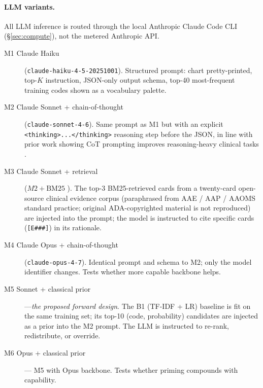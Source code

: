 \documentclass[preprint,authoryear,1p,12pt]{elsarticle}
\begin{document}
\paragraph{LLM variants.} All LLM inference is routed through the local
Anthropic Claude Code CLI (\S\ref{sec:compute}), not the metered
Anthropic API.

\begin{description}
    \item[M1 Claude Haiku] (\texttt{claude-haiku-4-5-20251001}). Structured
      prompt: chart pretty-printed, top-\(K\) instruction, JSON-only
      output schema, top-40 most-frequent training codes shown as a
      vocabulary palette.
    \item[M2 Claude Sonnet + chain-of-thought]
      (\texttt{claude-sonnet-4-6}). Same prompt as M1 but with an
      explicit \texttt{<thinking>...</thinking>} reasoning step before
      the JSON, in line with prior work showing CoT prompting improves
      reasoning-heavy clinical tasks
      \citep{wei2022chain,nori2023capabilities}.
    \item[M3 Claude Sonnet + retrieval] (\(M2 + \text{BM25}\)
      \citep{robertson1995bm25}). The top-3 BM25-retrieved cards from a
      twenty-card open-source clinical evidence corpus (paraphrased
      from AAE / AAP / AAOMS standard practice; original ADA-copyrighted
      material is not reproduced) are injected into the prompt; the
      model is instructed to cite specific cards (\texttt{[E\#\#\#]})
      in its rationale.
    \item[M4 Claude Opus + chain-of-thought] (\texttt{claude-opus-4-7}).
      Identical prompt and schema to M2; only the model identifier
      changes. Tests whether more capable backbone helps.
    \item[M5 Sonnet + classical prior]\hspace{0pt} ---\hspace{0pt}\emph{the
      proposed forward design}. The B1 (TF-IDF + LR) baseline is fit on
      the same training set; its top-10 (code, probability) candidates
      are injected as a prior into the M2 prompt. The LLM is instructed
      to re-rank, redistribute, or override.
    \item[M6 Opus + classical prior]\hspace{0pt} ---\hspace{0pt} M5 with
      Opus backbone. Tests whether priming compounds with capability.
\end{description}
\end{document}
